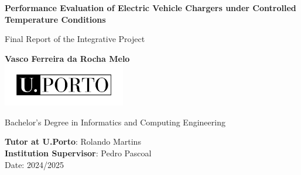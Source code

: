 \documentclass[10pt]{article}
\begin{document}
\begin{titlepage}
	\begin{center}
		\vspace*{1cm}
		
    {\fontsize{17}{16}\selectfont \textbf{Performance Evaluation of Electric Vehicle Chargers under Controlled Temperature Conditions}}
     
		
		\vspace{0.5cm}
		Final Report of the Integrative Project
		
		\vspace{1.5cm}
		
		\textbf{Vasco Ferreira da Rocha Melo}\\
		
		\vfill
		\includegraphics[width=0.4\textwidth]{UPORTO_fundotransparente}
		
		\vfill
		
	
		
		Bachelor’s Degree in Informatics and Computing Engineering		
		\vspace{0.8cm}
		
		\textbf{Tutor at U.Porto}: Rolando Martins\\
		\textbf{Institution Supervisor}: Pedro Pascoal\\

\vspace{0.4cm}
		Date: 2024/2025
		
	\end{center}
\end{titlepage}


\thispagestyle{empty} 
\clearpage

\thispagestyle{empty}
\renewcommand{\contentsname}{Contents}
\tableofcontents

 \clearpage


% 








\renewcommand{\refname}{Bibliography and References}

 

 
\end{document}
